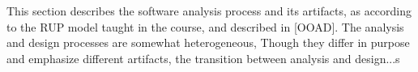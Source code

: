 \label{sec:software-analysis}

This section describes the software analysis process and its artifacts, as according to the RUP model taught in the course, and described in [OOAD]\cite{ooad}.
The analysis and design processes are somewhat heterogeneous, Though they differ in purpose and emphasize different artifacts, the transition between analysis and design...s
